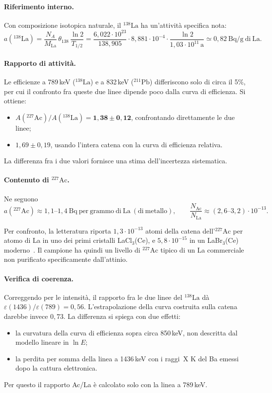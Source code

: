 \documentclass[11pt,a4paper]{article}
\newcommand{\nuc}[2]{\ensuremath{{}^{#1}\mathrm{#2}}}
\newcommand{\ee}[1]{\cdot 10^{#1}}
\begin{document}
\paragraph{Riferimento interno.}
Con composizione isotopica naturale, il \nuc{138}{La} ha un'attività specifica nota:
\[
a(\nuc{138}{La}) = \frac{N_A}{M_\mathrm{La}}\,\theta_{138}\,\frac{\ln2}{T_{1/2}}
= \frac{6{,}022\ee{23}}{138{,}905}\cdot 8{,}881\ee{-4}\cdot\frac{\ln 2}{1{,}03\ee{11}\,\mathrm{a}}
\simeq 0{,}82\ \mathrm{Bq/g\ di\ La}.
\]

\paragraph{Rapporto di attività.}
Le efficienze a 789\,keV (\nuc{138}{La}) e a 832\,keV (\nuc{211}{Pb}) differiscono solo di circa il 5\%, per cui il confronto fra queste due linee dipende poco dalla curva di efficienza. Si ottiene:
\begin{itemize}
\item $A(\nuc{227}{Ac})/A(\nuc{138}{La})=\mathbf{1{,}38\pm0{,}12}$, confrontando direttamente le due linee;
\item $1{,}69\pm0{,}19$, usando l'intera catena con la curva di efficienza relativa.
\end{itemize}
La differenza fra i due valori fornisce una stima dell'incertezza sistematica.

\paragraph{Contenuto di \nuc{227}{Ac}.}
Ne seguono
\[
a(\nuc{227}{Ac})\approx1{,}1\text{--}1{,}4\ \mathrm{Bq\ per\ grammo\ di\ La\ (di\ metallo)},
\qquad
\frac{N_\mathrm{Ac}}{N_\mathrm{La}}\approx(2{,}6\text{--}3{,}2)\ee{-13}.
\]

Per confronto, la letteratura riporta $1{,}3\ee{-13}$ atomi della catena dell'\nuc{227}{Ac} per atomo di La in uno dei primi cristalli LaCl$_3$(Ce), e $5{,}8\ee{-15}$ in un LaBr$_3$(Ce) moderno~\cite{labr2020}. Il campione ha quindi un livello di \nuc{227}{Ac} tipico di un La commerciale non purificato specificamente dall'attinio.

\paragraph{Verifica di coerenza.}
Correggendo per le intensità, il rapporto fra le due linee del \nuc{138}{La} dà $\varepsilon(1436)/\varepsilon(789)=0{,}56$. L'estrapolazione della curva costruita sulla catena darebbe invece $0{,}73$. La differenza si spiega con due effetti:
\begin{itemize}
\item la curvatura della curva di efficienza sopra circa 850\,keV, non descritta dal modello lineare in $\ln E$;
\item la perdita per somma della linea a 1436\,keV con i raggi~X K del Ba emessi dopo la cattura elettronica.
\end{itemize}
Per questo il rapporto Ac/La è calcolato solo con la linea a 789\,keV.
\end{document}
